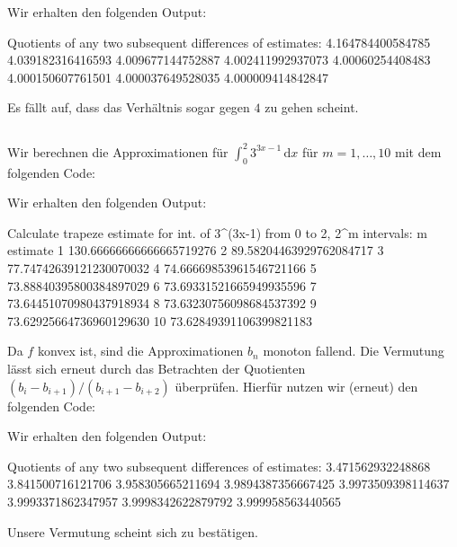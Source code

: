 

Wir erhalten den folgenden Output:

\begin{consoleoutput}
Quotients of any two subsequent differences of estimates:
4.164784400584785
4.039182316416593
4.009677144752887
4.002411992937073
4.00060254408483
4.000150607761501
4.000037649528035
4.000009414842847
\end{consoleoutput}

Es fällt auf, dass das Verhältnis sogar gegen $4$ zu gehen scheint.





\subsection{}

Wir berechnen die Approximationen für $\int_0^2 3^{3x-1} \,\text{d}x$ für $m = 1, \dotsc, 10$ mit dem folgenden Code:



Wir erhalten den folgenden Output:

\begin{consoleoutput}
Calculate trapeze estimate for int. of 3^(3x-1) from 0 to 2, 2^m intervals:
 m      estimate
 1      130.66666666666665719276
 2       89.58204463929762084717
 3       77.74742639121230070032
 4       74.66669853961546721166
 5       73.88840395800384897029
 6       73.69331521665949935596
 7       73.64451070980437918934
 8       73.63230756098684537392
 9       73.62925664736960129630
10       73.62849391106399821183
\end{consoleoutput}


Da $f$ konvex ist, sind die Approximationen $b_n$ monoton fallend.
Die Vermutung lässt sich erneut durch das Betrachten der Quotienten $(b_i - b_{i+1})/(b_{i+1} - b_{i+2})$ überprüfen.
Hierfür nutzen wir (erneut) den folgenden Code:



Wir erhalten den folgenden Output:

\begin{consoleoutput}
Quotients of any two subsequent differences of estimates:
3.471562932248868
3.841500716121706
3.958305665211694
3.9894387356667425
3.9973509398114637
3.9993371862347957
3.9998342622879792
3.999958563440565
\end{consoleoutput}

Unsere Vermutung scheint sich zu bestätigen.
